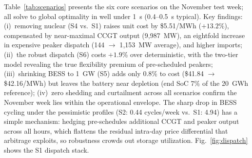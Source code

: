 \documentclass[preprint,12pt,authoryear]{elsarticle}
\begin{document}
Table~\ref{tab:scenarios} presents the six core scenarios on the November test week; all solve to global optimality in well under 1~s (0.4--0.5~s typical). Key findings: (i)~removing nuclear (S4 vs.\ S1) raises unit cost by \$5.51/MWh ($+13.2\%$), compensated by near-maximal CCGT output (9{,}987~MW), an eightfold increase in expensive peaker dispatch (144 $\to$ 1{,}153~MW average), and higher imports; (ii)~the robust dispatch (S6) costs $+1.9\%$ over deterministic, with the two-tier model revealing the true flexibility premium of pre-scheduled peakers; (iii)~shrinking BESS to 1~GW (S5) adds only $0.8\%$ to cost (\$41.84 $\to$ \$42.16/MWh) but leaves the battery near depletion (end SoC 7\% of the 20~GWh reference); (iv)~zero shedding and curtailment across all scenarios confirm the November week lies within the operational envelope. The sharp drop in BESS cycling under the pessimistic profiles (S2: 0.44 cycles/week vs.\ S1: 4.94) has a simple mechanism: hedging pre-schedules additional CCGT and peaker output across all hours, which flattens the residual intra-day price differential that arbitrage exploits, so robustness crowds out storage utilization. Fig.~\ref{fig:dispatch} shows the S1 dispatch stack.

\begin{table}[htbp]
\centering
\caption{MILP scenario comparison (168-h dispatch, November 2023). Two-tier gas: CCGT (\$40/MWh, $\pm$800~MW/h, UC) + peakers (\$65/MWh, $\pm$5{,}000~MW/h). End-of-horizon SoC $\geq$ 35\% enforced.}
\label{tab:scenarios}
\small
{}
\end{table}
\end{document}
